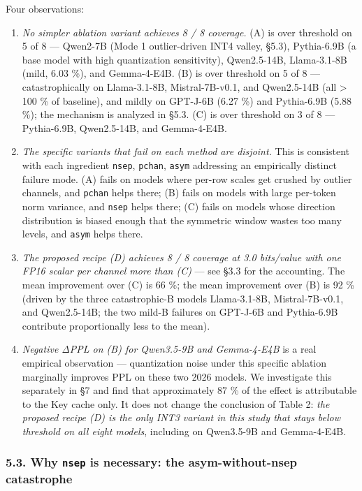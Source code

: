 Four observations:

\begin{enumerate}
\def\labelenumi{\arabic{enumi}.}
\item
  \emph{No simpler ablation variant achieves 8 / 8 coverage.} (A) is
  over threshold on 5 of 8 --- Qwen2-7B (Mode 1 outlier-driven INT4
  valley, §5.3), Pythia-6.9B (a base model with high quantization
  sensitivity), Qwen2.5-14B, Llama-3.1-8B (mild, 6.03 \%), and
  Gemma-4-E4B. (B) is over threshold on 5 of 8 --- catastrophically on
  Llama-3.1-8B, Mistral-7B-v0.1, and Qwen2.5-14B (all \textgreater{} 100
  \% of baseline), and mildly on GPT-J-6B (6.27 \%) and Pythia-6.9B
  (5.88 \%); the mechanism is analyzed in §5.3. (C) is over threshold on
  3 of 8 --- Pythia-6.9B, Qwen2.5-14B, and Gemma-4-E4B.
\item
  \emph{The specific variants that fail on each method are disjoint.}
  This is consistent with each ingredient \texttt{nsep}, \texttt{pchan},
  \texttt{asym} addressing an empirically distinct failure mode. (A)
  fails on models where per-row scales get crushed by outlier channels,
  and \texttt{pchan} helps there; (B) fails on models with large
  per-token norm variance, and \texttt{nsep} helps there; (C) fails on
  models whose direction distribution is biased enough that the
  symmetric window wastes too many levels, and \texttt{asym} helps
  there.
\item
  \emph{The proposed recipe (D) achieves 8 / 8 coverage at 3.0
  bits/value with one FP16 scalar per channel more than (C)} --- see
  §3.3 for the accounting. The mean improvement over (C) is 66 \%; the
  mean improvement over (B) is 92 \% (driven by the three catastrophic-B
  models Llama-3.1-8B, Mistral-7B-v0.1, and Qwen2.5-14B; the two mild-B
  failures on GPT-J-6B and Pythia-6.9B contribute proportionally less to
  the mean).
\item
  \emph{Negative ΔPPL on (B) for Qwen3.5-9B and Gemma-4-E4B} is a real
  empirical observation --- quantization noise under this specific
  ablation marginally improves PPL on these two 2026 models. We
  investigate this separately in §7 and find that approximately 87 \% of
  the effect is attributable to the Key cache only. It does not change
  the conclusion of Table 2: \emph{the proposed recipe (D) is the only
  INT3 variant in this study that stays below threshold on all eight
  models}, including on Qwen3.5-9B and Gemma-4-E4B.
\end{enumerate}

\subsubsection{\texorpdfstring{5.3. Why \texttt{nsep} is necessary: the
asym-without-nsep
catastrophe}{5.3. Why nsep is necessary: the asym-without-nsep catastrophe}}\label{why-nsep-is-necessary-the-asym-without-nsep-catastrophe}


